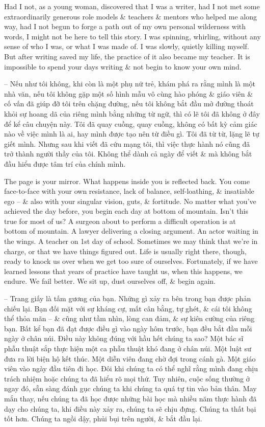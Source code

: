 \documentclass{article}
\begin{document}
\begin{itemize}
	Had I not, as a young woman, discovered that I was a writer, had I not met some extraordinarily generous role models \& teachers \& mentors who helped me along way, had I not begun to forge a path out of my own personal wilderness with words, I might not be here to tell this story. I was spinning, whirling, without any sense of who I was, or what I was made of. I was slowly, quietly killing myself. But after writing saved my life, the practice of it also became my teacher. It is impossible to spend your days writing \& not begin to know your own mind.
	
	-- Nếu như tôi không, khi còn là một phụ nữ trẻ, khám phá ra rằng mình là một nhà văn, nếu tôi không gặp một số hình mẫu vô cùng hào phóng \& giáo viên \& cố vấn đã giúp đỡ tôi trên chặng đường, nếu tôi không bắt đầu mở đường thoát khỏi sự hoang dã của riêng mình bằng những từ ngữ, thì có lẽ tôi đã không ở đây để kể câu chuyện này. Tôi đã quay cuồng, quay cuồng, không có bất kỳ cảm giác nào về việc mình là ai, hay mình được tạo nên từ điều gì. Tôi đã từ từ, lặng lẽ tự giết mình. Nhưng sau khi viết đã cứu mạng tôi, thì việc thực hành nó cũng đã trở thành người thầy của tôi. Không thể dành cả ngày để viết \& mà không bắt đầu hiểu được tâm trí của chính mình.
	
	The page is your mirror. What happens inside you is reflected back. You come face-to-face with your own resistance, lack of balance, self-loathing, \& insatiable ego -- \& also with your singular vision, guts, \& fortitude. No matter what you've achieved the day before, you begin each day at bottom of mountain. Isn't this true for most of us? A surgeon about to perform a difficult operation is at bottom of mountain. A lawyer delivering a closing argument. An actor waiting in the wings. A teacher on 1st day of school. Sometimes we may think that we're in charge, or that we have things figured out. Life is usually right there, though, ready to knock us over when we get too sure of ourselves. Fortunately, if we have learned lessons that years of practice have taught us, when this happens, we endure. We fail better. We sit up, dust ourselves off, \& begin again.
	
	-- Trang giấy là tấm gương của bạn. Những gì xảy ra bên trong bạn được phản chiếu lại. Bạn đối mặt với sự kháng cự, mất cân bằng, tự ghét, \& cái tôi không thể thỏa mãn -- \& cũng như tầm nhìn, lòng can đảm, \& sự kiên cường của riêng bạn. Bất kể bạn đã đạt được điều gì vào ngày hôm trước, bạn đều bắt đầu mỗi ngày ở chân núi. Điều này không đúng với hầu hết chúng ta sao? Một bác sĩ phẫu thuật sắp thực hiện một ca phẫu thuật khó đang ở chân núi. Một luật sư đưa ra lời biện hộ kết thúc. Một diễn viên đang chờ đợi trong cánh gà. Một giáo viên vào ngày đầu tiên đi học. Đôi khi chúng ta có thể nghĩ rằng mình đang chịu trách nhiệm hoặc chúng ta đã hiểu rõ mọi thứ. Tuy nhiên, cuộc sống thường ở ngay đó, sẵn sàng đánh gục chúng ta khi chúng ta quá tự tin vào bản thân. May mắn thay, nếu chúng ta đã học được những bài học mà nhiều năm thực hành đã dạy cho chúng ta, khi điều này xảy ra, chúng ta sẽ chịu đựng. Chúng ta thất bại tốt hơn. Chúng ta ngồi dậy, phủi bụi trên người, \& bắt đầu lại.
	

\end{itemize}
\end{document}
